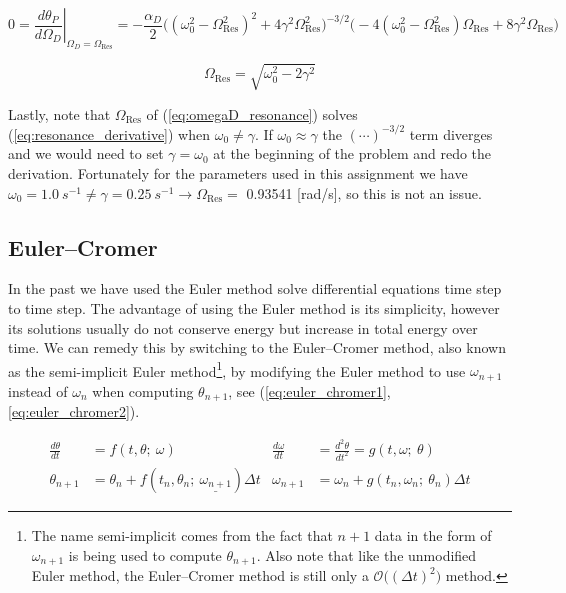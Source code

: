 \documentclass[notitlepage,aps,prd,nofootinbib]{revtex4-1}
\DeclareRobustCommand{\orderof}{\ensuremath{\mathcal{O}}}
\begin{document}
\begin{equation} \label{eq:resonance_derivative}
0 = \left.\frac{d \theta_{P}}{d \Omega_{D}}\right|_{\Omega_{D} = \Omega_{\text{Res}}}
= -\frac{\alpha_{D}}{2} \bigg( \left(\omega_{0}^2 - \Omega_{\text{Res}}^2\right)^2 + 4 \gamma^2 \Omega_{\text{Res}}^2 \bigg)^{-3/2}
\bigg(- 4 \left(\omega_{0}^2 - \Omega_{\text{Res}}^2\right) \Omega_{\text{Res}} + 8 \gamma^2 \Omega_{\text{Res}} \bigg)
\end{equation}

\begin{equation} \label{eq:omegaD_resonance}
\Omega_{\text{Res}} = \sqrt{ \omega_{0}^2 - 2 \gamma^2} 
\end{equation}

Lastly, note that $\Omega_{\text{Res}}$ of (\ref{eq:omegaD_resonance}) solves (\ref{eq:resonance_derivative}) when $\omega_{0} \neq \gamma$. If $\omega_{0} \approx \gamma$ the $(\cdots)^{-3/2}$ term diverges and we would need to set $\gamma = \omega_{0}$ at the beginning of the problem and redo the derivation. Fortunately for the parameters used in this assignment we have $\omega_{0} = 1.0~s^{-1} \neq \gamma = 0.25~s^{-1} \rightarrow \Omega_{\text{Res}} =$ 0.93541 [rad/s], so this is not an issue.

\clearpage
\subsection{Euler--Cromer}
\label{subsec:eulercromer}
In the past we have used the Euler method solve differential equations time step to time step. The advantage of using the Euler method is its simplicity, however its solutions usually do not conserve energy but increase in total energy over time. We can remedy this by switching to the Euler--Cromer method, also known as the semi-implicit Euler method\footnote{The name semi-implicit comes from the fact that $n+1$ data in the form of $\omega_{n+1}$ is being used to compute $\theta_{n+1}$. Also note that like the unmodified Euler method, the Euler--Cromer method is still only a $\orderof\big(\left(\Delta t\right)^2\big)$ method.}, by modifying the Euler method to use $\omega_{n+1}$ instead of $\omega_{n}$ when computing $\theta_{n+1}$, see (\ref{eq:euler_chromer1}, \ref{eq:euler_chromer2}).

\begin{align}
\frac{d \theta}{d t} &= f\left(t, \theta;~\omega\right) &
\frac{d \omega}{d t} &= \frac{d^2 \theta}{d t^2} = g\left(t, \omega;~\theta\right) \label{eq:euler_chromer1} \\
\theta_{n+1} &= \theta_{n} + f\left(t_{n}, \theta_{n};~\underline{\omega_{n+1}}\right) \Delta t & 
\omega_{n+1} &= \omega_{n} + g\left(t_{n}, \omega_{n};~\theta_{n}\right) \Delta t \label{eq:euler_chromer2}
\end{align}
\end{document}
